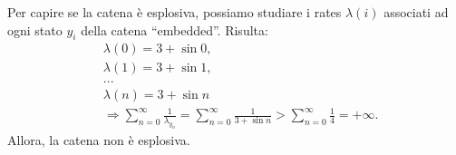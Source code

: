 \documentclass[11pt,largemargins]{homework}
\begin{document}
\begin{alphaparts}
\questionpart
Per capire se la catena è esplosiva, possiamo studiare i rates $\lambda\left(i\right)$ associati ad ogni stato $y_{i}$ della catena ``embedded''. Risulta:
\begin{align*}
&\lambda\left(0\right)= 3+ \sin{0},\\
&\lambda\left(1\right)= 3 + \sin{1},\\
&...\\
&\lambda\left(n\right)=3+\sin{n}\\
&\Rightarrow \sum_{n=0}^{\infty}\frac{1}{\lambda_{y_{n}}}=\sum_{n=0}^{\infty}\frac{1}{3+\sin{n}}>\sum_{n=0}^{\infty}\frac{1}{4}=+\infty.
\end{align*}
Allora, la catena non è esplosiva.
  \end{alphaparts}
  
  
  
  \newpage
\end{document}
